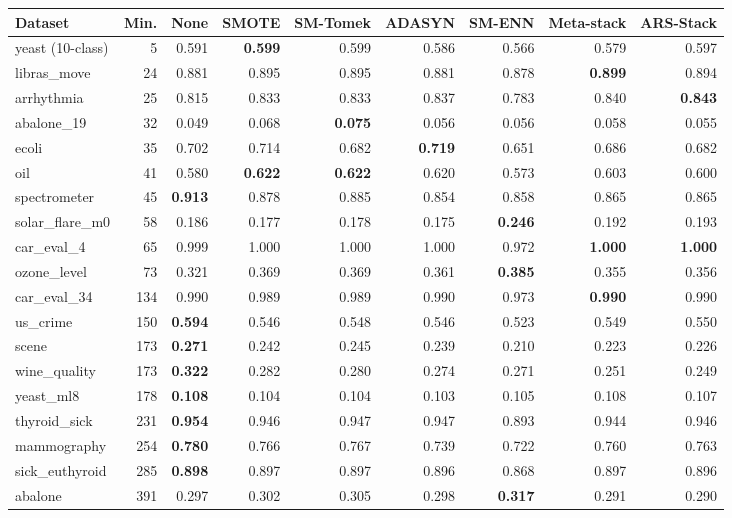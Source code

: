 \begin{tabular}{lrrrrrrrr}
\toprule
Dataset & Min. & None & SMOTE & SM-Tomek & ADASYN & SM-ENN & Meta-stack & ARS-Stack \\
\midrule
yeast (10-class) & 5 & 0.591 & \textbf{0.599} & 0.599 & 0.586 & 0.566 & 0.579 & 0.597 \\
libras\_move & 24 & 0.881 & 0.895 & 0.895 & 0.881 & 0.878 & \textbf{0.899} & 0.894 \\
arrhythmia & 25 & 0.815 & 0.833 & 0.833 & 0.837 & 0.783 & 0.840 & \textbf{0.843} \\
abalone\_19 & 32 & 0.049 & 0.068 & \textbf{0.075} & 0.056 & 0.056 & 0.058 & 0.055 \\
ecoli & 35 & 0.702 & 0.714 & 0.682 & \textbf{0.719} & 0.651 & 0.686 & 0.682 \\
oil & 41 & 0.580 & \textbf{0.622} & \textbf{0.622} & 0.620 & 0.573 & 0.603 & 0.600 \\
spectrometer & 45 & \textbf{0.913} & 0.878 & 0.885 & 0.854 & 0.858 & 0.865 & 0.865 \\
solar\_flare\_m0 & 58 & 0.186 & 0.177 & 0.178 & 0.175 & \textbf{0.246} & 0.192 & 0.193 \\
car\_eval\_4 & 65 & 0.999 & 1.000 & 1.000 & 1.000 & 0.972 & \textbf{1.000} & \textbf{1.000} \\
ozone\_level & 73 & 0.321 & 0.369 & 0.369 & 0.361 & \textbf{0.385} & 0.355 & 0.356 \\
car\_eval\_34 & 134 & 0.990 & 0.989 & 0.989 & 0.990 & 0.973 & \textbf{0.990} & 0.990 \\
us\_crime & 150 & \textbf{0.594} & 0.546 & 0.548 & 0.546 & 0.523 & 0.549 & 0.550 \\
scene & 173 & \textbf{0.271} & 0.242 & 0.245 & 0.239 & 0.210 & 0.223 & 0.226 \\
wine\_quality & 173 & \textbf{0.322} & 0.282 & 0.280 & 0.274 & 0.271 & 0.251 & 0.249 \\
yeast\_ml8 & 178 & \textbf{0.108} & 0.104 & 0.104 & 0.103 & 0.105 & 0.108 & 0.107 \\
thyroid\_sick & 231 & \textbf{0.954} & 0.946 & 0.947 & 0.947 & 0.893 & 0.944 & 0.946 \\
mammography & 254 & \textbf{0.780} & 0.766 & 0.767 & 0.739 & 0.722 & 0.760 & 0.763 \\
sick\_euthyroid & 285 & \textbf{0.898} & 0.897 & 0.897 & 0.896 & 0.868 & 0.897 & 0.896 \\
abalone & 391 & 0.297 & 0.302 & 0.305 & 0.298 & \textbf{0.317} & 0.291 & 0.290 \\

\end{tabular}
